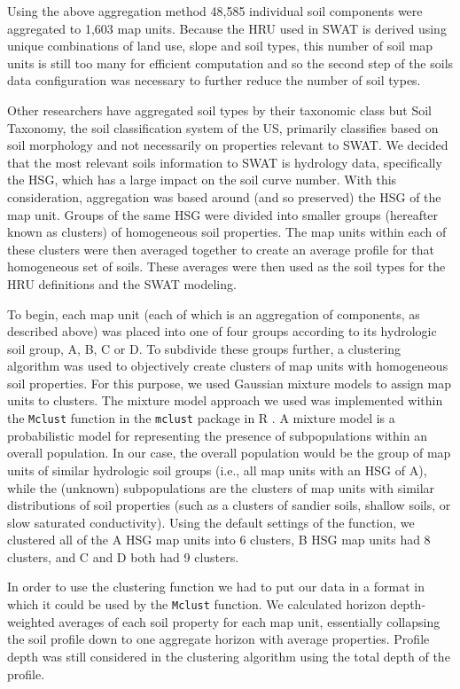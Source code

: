 Using the above aggregation method 48,585 individual soil components were
aggregated to 1,603 map units. Because the HRU used in
SWAT is derived using unique combinations of land use, slope and soil types,
this number of soil map units is still too many for efficient computation  and so
the second step of the soils data configuration was necessary to further reduce
the number of soil types.

Other researchers have aggregated soil types by their taxonomic class
\citep{gatzke_aggregation_2011} but Soil Taxonomy, the soil classification system of the US, primarily classifies based on soil morphology and not
necessarily on properties relevant to SWAT. We decided that the most relevant soils
information to SWAT is hydrology data, specifically the HSG, which has a large impact on the soil curve number. With this
consideration, aggregation was based around (and so preserved) the HSG of the
map unit. Groups of the same HSG were divided into smaller groups (hereafter
known as clusters) of homogeneous soil properties. The map units within each of these clusters were then averaged together to create an average profile for that homogeneous set of soils. These averages were then
used as the soil types for the HRU definitions and the SWAT modeling.

To begin, each map unit (each of which is an aggregation of components, as described above)
 was placed into one of four groups according to its hydrologic soil
group, A, B, C or D. To subdivide these groups further, a clustering algorithm
was used to objectively create clusters of map units with
homogeneous soil properties. For this purpose, we used Gaussian mixture models to
assign map units to clusters. The mixture model approach we used was implemented within the
\texttt{Mclust} function in the \texttt{mclust} package in R \citep{fraley_mclust_2012}.
A mixture model is a probabilistic model for representing the presence of
subpopulations within an overall population. In our case, the overall population
would be the group of map units of similar hydrologic soil groups (i.e., all map units
with an HSG of A), while the (unknown) subpopulations are the clusters of
map units with similar distributions of soil properties (such as a clusters of
sandier soils, shallow soils, or slow saturated conductivity). Using the default
settings of the function, we clustered all of the A HSG map units into
6 clusters, B HSG map units had 8 clusters, and C and D both had 9 clusters.

In order to use the clustering function we had to put our data in a format in which it could 
be used by the \texttt{Mclust} function. We calculated horizon depth-weighted averages of each soil property for each map unit, essentially collapsing the soil profile down to one aggregate horizon with average properties. Profile depth was still
considered in the clustering algorithm using the total depth of the profile.


